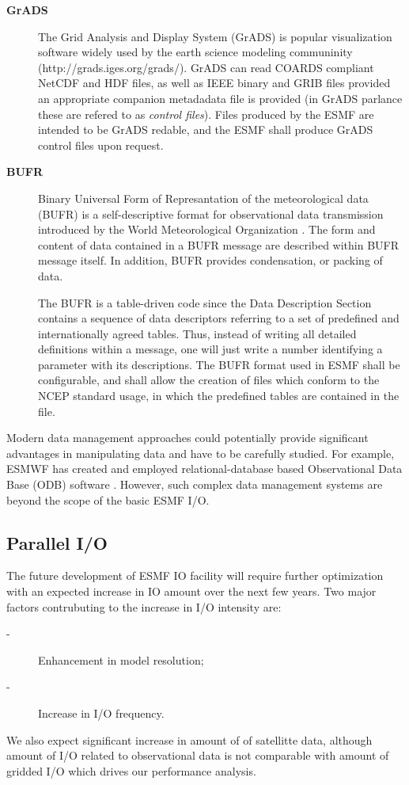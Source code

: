 \begin{description}
\item[\bf GrADS] The Grid Analysis and Display System (GrADS) is popular 
visualization software widely used by the earth science modeling
communinity (http://grads.iges.org/grads/). GrADS can read COARDS
compliant NetCDF and HDF files, as well as IEEE binary and GRIB files
provided an appropriate companion metadadata file is provided (in
GrADS parlance these are refered to as {\em control files}). Files
produced by the ESMF are intended to be GrADS redable, and the ESMF
shall produce GrADS control files upon request.

\item[\bf BUFR] Binary Universal Form of Represantation of the meteorological 
data (BUFR) is a self-descriptive format for observational data
transmission introduced by the World Meteorological Organization
\cite{WMO-BUFR-CREX}. The form and content of data contained in a BUFR 
message are described within BUFR message itself. In addition, BUFR provides 
condensation, or packing of data. 

The BUFR is a table-driven code since the Data Description Section
contains a sequence of data descriptors referring to a set of
predefined and internationally agreed tables. Thus, instead of writing
all detailed definitions within a message, one will just write a
number identifying a parameter with its descriptions. The BUFR format
used in ESMF shall be configurable, and shall allow the creation of
files which conform to the NCEP standard usage, in which the
predefined tables are contained in the file.

\end{description}

Modern data management approaches could potentially provide significant 
advantages in manipulating data and have to be carefully studied.
For example, ESMWF has created and employed relational-database based 
Observational Data Base (ODB) software \cite{ODB}.  However, such complex 
data management systems are beyond the scope of the basic ESMF I/O. 


\subsection{Parallel I/O}

The future development of ESMF IO facility will require further
optimization with an expected increase in IO amount over the next few
years. Two major factors contrubuting to the increase in I/O intensity are:
\begin{description}
\item[-] Enhancement in model resolution;
\item[-] Increase in I/O frequency.
\end{description}
We also expect significant increase in amount of of satellitte data, although 
amount of I/O related to observational data is not comparable with amount of 
gridded I/O which drives our performance analysis. 

